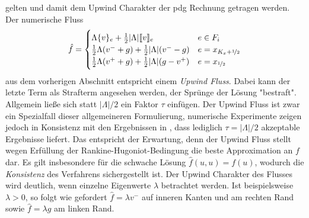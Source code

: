 gelten und damit dem Upwind Charakter der \ac{pdg} Rechnung getragen werden. Der numerische Fluss
\begin{equation}
  \begin{aligned}
    \hat{f} = \begin{cases}
    \Lambda\{ v \}_e + \frac{1}{2}|\Lambda|\llbracket v \rrbracket_e & e\in F_i \\
    \frac{1}{2}\Lambda(v^- + g) + \frac{1}{2}|\Lambda|(v^- - g)   & e=x_{K_x+\nicefrac{1}{2}} \\
    \frac{1}{2}\Lambda(v^+ + g) + \frac{1}{2}|\Lambda|(g - v^+)   & e=x_{\nicefrac{1}{2}}
  \end{cases}
  \end{aligned}
\end{equation}
aus dem vorherigen Abschnitt entspricht einem \emph{Upwind Fluss}. Dabei kann der letzte Term als Strafterm angesehen werden, der Sprünge der Lösung "bestraft". Allgemein ließe sich statt $|\Lambda|/2$ ein Faktor $\tau$ einfügen. Der Upwind Fluss ist zwar ein Spezialfall dieser allgemeineren Formulierung, numerische Experimente zeigen jedoch in Konsistenz mit den Ergebnissen in \cite{feistauer2004}, dass lediglich $\tau=|\Lambda|/2$ akzeptable Ergebnisse liefert. Das entspricht der Erwartung, denn der Upwind Fluss stellt wegen Erfüllung der Rankine-Hugoniot-Bedingung die beste Approximation an $f$ dar. Es gilt insbesondere für die schwache Lösung $\hat{f}(u,u)=f(u)$, wodurch die \emph{Konsistenz} des Verfahrens sichergestellt ist. Der Upwind Charakter des Flusses wird deutlich, wenn einzelne Eigenwerte $\lambda$ betrachtet werden. Ist beispielsweise $\lambda>0$, so folgt wie gefordert $\hat{f}=\lambda v^-$ auf inneren Kanten und am rechten Rand sowie $\hat{f}=\lambda g$ am linken Rand.

